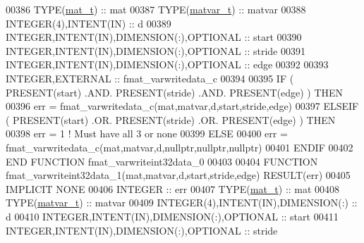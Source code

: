 \begin{DoxyCode}
00386     \textcolor{keywordtype}{TYPE}(\hyperlink{group___m_a_t_gab0fc888f5a5d79943b16284b1f91c2e8}{mat\_t})                              :: mat
00387     \textcolor{keywordtype}{TYPE}(\hyperlink{group___m_a_t_structmatvar__t}{matvar\_t})                           :: matvar
00388     \textcolor{keywordtype}{INTEGER(4)},\textcolor{keywordtype}{INTENT(IN)}                    :: d
00389     \textcolor{keywordtype}{INTEGER},\textcolor{keywordtype}{INTENT(IN)},\textcolor{keywordtype}{DIMENSION(:)},\textcolor{keywordtype}{OPTIONAL} :: start
00390     \textcolor{keywordtype}{INTEGER},\textcolor{keywordtype}{INTENT(IN)},\textcolor{keywordtype}{DIMENSION(:)},\textcolor{keywordtype}{OPTIONAL} :: stride
00391     \textcolor{keywordtype}{INTEGER},\textcolor{keywordtype}{INTENT(IN)},\textcolor{keywordtype}{DIMENSION(:)},\textcolor{keywordtype}{OPTIONAL} :: edge
00392 
00393     \textcolor{keywordtype}{INTEGER},\textcolor{keywordtype}{EXTERNAL}                         :: fmat\_varwritedata\_c
00394 
00395     \textcolor{keywordflow}{IF} ( \textcolor{keyword}{PRESENT}(start) .AND. \textcolor{keyword}{PRESENT}(stride) .AND. \textcolor{keyword}{PRESENT}(edge) ) \textcolor{keywordflow}{THEN}
00396         err = fmat\_varwritedata\_c(mat,matvar,d,start,stride,edge)
00397     \textcolor{keywordflow}{ELSEIF} ( \textcolor{keyword}{PRESENT}(start) .OR. \textcolor{keyword}{PRESENT}(stride) .OR. \textcolor{keyword}{PRESENT}(edge) ) \textcolor{keywordflow}{THEN}
00398         err = 1    \textcolor{comment}{! Must have all 3 or none}
00399     \textcolor{keywordflow}{ELSE}
00400         err = fmat\_varwritedata\_c(mat,matvar,d,nullptr,nullptr,nullptr)
00401 \textcolor{keywordflow}{    ENDIF}
00402 \textcolor{keyword}{END FUNCTION }fmat\_varwriteint32data\_0
00403 
00404 \textcolor{keyword}{FUNCTION }fmat\_varwriteint32data\_1(mat,matvar,d,start,stride,edge) \textcolor{keyword}{RESULT}(err)
00405 \textcolor{keywordtype}{IMPLICIT NONE}
00406     \textcolor{keywordtype}{INTEGER}                                  :: err
00407     \textcolor{keywordtype}{TYPE}(\hyperlink{group___m_a_t_gab0fc888f5a5d79943b16284b1f91c2e8}{mat\_t})                              :: mat
00408     \textcolor{keywordtype}{TYPE}(\hyperlink{group___m_a_t_structmatvar__t}{matvar\_t})                           :: matvar
00409     \textcolor{keywordtype}{INTEGER(4)},\textcolor{keywordtype}{INTENT(IN)},\textcolor{keywordtype}{DIMENSION(:)}       :: d
00410     \textcolor{keywordtype}{INTEGER},\textcolor{keywordtype}{INTENT(IN)},\textcolor{keywordtype}{DIMENSION(:)},\textcolor{keywordtype}{OPTIONAL} :: start
00411     \textcolor{keywordtype}{INTEGER},\textcolor{keywordtype}{INTENT(IN)},\textcolor{keywordtype}{DIMENSION(:)},\textcolor{keywordtype}{OPTIONAL} :: stride

\end{DoxyCode}
